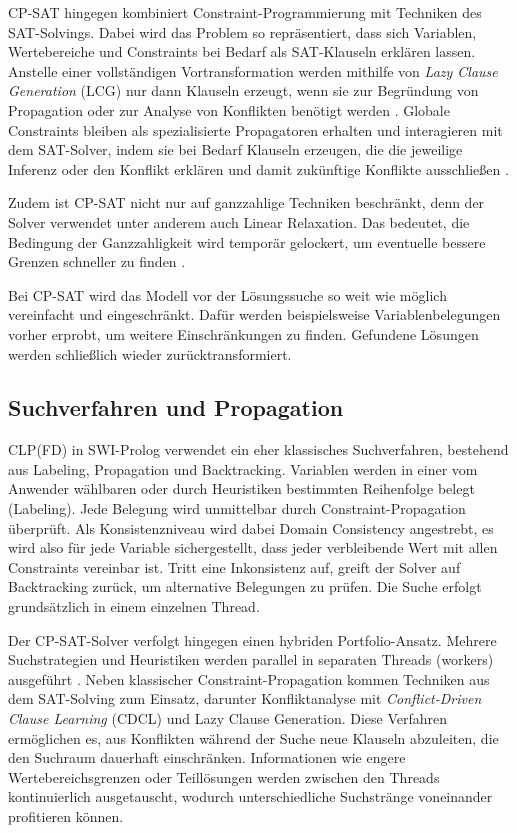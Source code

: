 \documentclass[12pt,a4paper]{article}
\begin{document}
CP-SAT hingegen kombiniert Constraint-Programmierung mit Techniken des SAT-Solvings.
Dabei wird das Problem so repräsentiert, dass sich Variablen, Wertebereiche und Constraints bei Bedarf als SAT-Klauseln erklären lassen.
Anstelle einer vollständigen Vortransformation werden mithilfe von \emph{Lazy Clause Generation} (LCG) nur dann Klauseln erzeugt, wenn sie zur Begründung von Propagation oder zur Analyse von Konflikten benötigt werden \cite{Stuckey2010}.
Globale Constraints bleiben als spezialisierte Propagatoren erhalten und interagieren mit dem SAT-Solver, indem sie bei Bedarf Klauseln erzeugen, die die jeweilige Inferenz oder den Konflikt erklären und damit zukünftige Konflikte ausschließen \cite{cp-sat-primer}.

Zudem ist CP-SAT nicht nur auf ganzzahlige Techniken beschränkt, denn der Solver verwendet unter anderem auch Linear Relaxation.
Das bedeutet, die Bedingung der Ganzzahligkeit wird temporär gelockert, um eventuelle bessere Grenzen schneller zu finden \cite{cp-sat-primer}.

Bei CP-SAT wird das Modell vor der Lösungssuche so weit wie möglich vereinfacht und eingeschränkt.
Dafür werden beispielsweise Variablenbelegungen vorher erprobt, um weitere Einschränkungen zu finden.
Gefundene Lösungen werden schließlich wieder zurücktransformiert.
\subsection{Suchverfahren und Propagation}
\label{sec:search_prop}
CLP(FD) in SWI-Prolog verwendet ein eher \glqq klassisches\grqq{} Suchverfahren, bestehend aus Labeling, Propagation und Backtracking.
Variablen werden in einer vom Anwender wählbaren oder durch Heuristiken bestimmten Reihenfolge belegt (Labeling).
Jede Belegung wird unmittelbar durch Constraint-Propagation überprüft.
Als Konsistenzniveau wird dabei Domain Consistency angestrebt, es wird also für jede Variable sichergestellt, dass jeder verbleibende Wert mit allen Constraints vereinbar ist.
Tritt eine Inkonsistenz auf, greift der Solver auf Backtracking zurück, um alternative Belegungen zu prüfen.
Die Suche erfolgt grundsätzlich in einem einzelnen Thread.

Der CP-SAT-Solver verfolgt hingegen einen hybriden Portfolio-Ansatz.
Mehrere Suchstrategien und Heuristiken werden parallel in separaten Threads (workers) ausgeführt \cite{perron}.
Neben klassischer Constraint-Propagation kommen Techniken aus dem SAT-Solving zum Einsatz, darunter Konfliktanalyse mit \emph{Conflict-Driven Clause Learning} (CDCL) und Lazy Clause Generation.
Diese Verfahren ermöglichen es, aus Konflikten während der Suche neue Klauseln abzuleiten, die den Suchraum dauerhaft einschränken.
Informationen wie engere Wertebereichsgrenzen oder Teillösungen werden zwischen den Threads kontinuierlich ausgetauscht, wodurch unterschiedliche Suchstränge voneinander profitieren können. 
\end{document}
